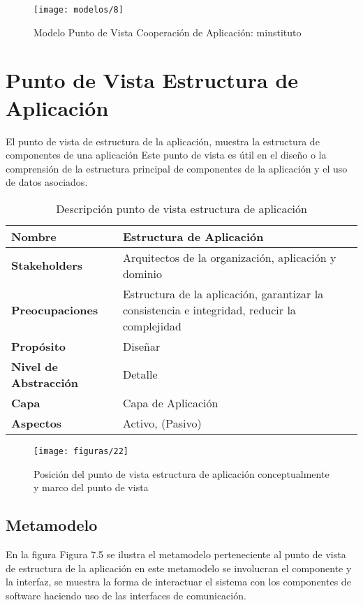 \begin{figure}[H]
	\centering
	\texttt{[image: modelos/8]}
	\captionsetup{width=.95\textwidth}
	\caption{Modelo Punto de Vista Cooperación de Aplicación: minstituto}
	\label{modelo8}
\end{figure}

\section{Punto de Vista Estructura de Aplicación}
El punto de vista de estructura de la aplicación, muestra la estructura de componentes de una aplicación Este punto de vista es útil en el diseño o la comprensión de la estructura principal de componentes de la aplicación y el uso de datos asociados.

  \begin{table}[H]
  	\centering
  	\begin{tabular}{lp{8cm}}
  		\toprule
  		\textbf{Nombre} & \textbf{Estructura de Aplicación} \\
  		\midrule
  		\textbf{Stakeholders} & Arquitectos de la organización, aplicación y dominio \\
  		\textbf{Preocupaciones} & Estructura de la aplicación, garantizar la consistencia e integridad, reducir la complejidad \\
  		\textbf{Propósito} & Diseñar \\
  		\textbf{Nivel de Abstracción} & Detalle \\
  		\textbf{Capa} & Capa de Aplicación \\
  		\textbf{Aspectos} & Activo, (Pasivo) \\
  		\bottomrule
  	\end{tabular}
  	\captionsetup{width=.95\textwidth}
  	\caption{Descripción punto de vista estructura de aplicación}
  	\label{tabla12}
  \end{table}

  \begin{figure}[H]
	\centering
	\texttt{[image: figuras/22]}
	\captionsetup{width=.95\textwidth}
	\caption{Posición del punto de vista estructura de aplicación conceptualmente y marco del punto de vista}
	\label{figura22}
  \end{figure}

  \subsection{Metamodelo}
  En la figura Figura 7.5 se ilustra el metamodelo perteneciente al punto de vista de estructura de la aplicación en este metamodelo se involucran el componente y la interfaz, se muestra la forma de interactuar el sistema con los componentes de software haciendo uso de las interfaces de comunicación.

